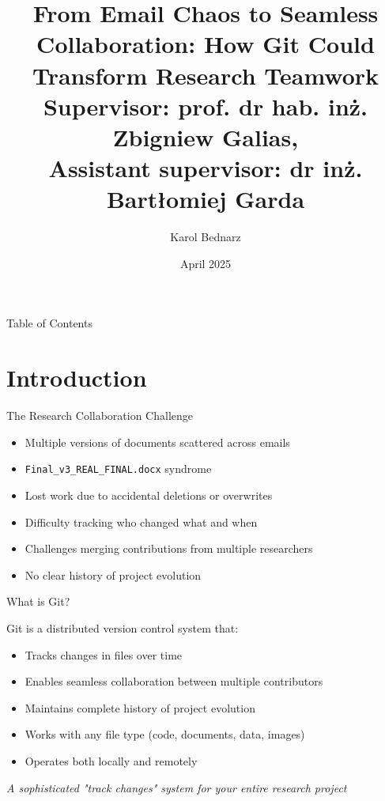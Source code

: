 \documentclass[aspectratio=1609]{beamer}
\title{ From Email Chaos to Seamless Collaboration: How Git Could Transform Research Teamwork\\
\small Supervisor: prof. dr hab. inż. Zbigniew Galias, \\
Assistant supervisor: dr inż. Bartłomiej Garda
}
\date{April 2025}
\author{Karol Bednarz}
\begin{document}
\begin{frame}
\titlepage
\end{frame}

\begin{frame}{Table of Contents}
    \tableofcontents
\end{frame}

\section{Introduction}
\begin{frame}[fragile]{The Research Collaboration Challenge}
    \begin{tblock}{}
        \begin{itemize}
            \item Multiple versions of documents scattered across emails
            \item \verb|Final_v3_REAL_FINAL.docx| syndrome
            \item Lost work due to accidental deletions or overwrites
            \item Difficulty tracking who changed what and when
            \item Challenges merging contributions from multiple researchers
            \item No clear history of project evolution
        \end{itemize}
    \end{tblock}
\end{frame}

\begin{frame}{What is Git?}
    \begin{tblock}{Git is a distributed version control system that:}
        \begin{itemize}
            \item Tracks changes in files over time
            \item Enables seamless collaboration between multiple contributors
            \item Maintains complete history of project evolution
            \item Works with any file type (code, documents, data, images)
            \item Operates both locally and remotely
        \end{itemize}
    \end{tblock}
    \begin{talert}{}
        \emph{A sophisticated "track changes" system for your entire research project}
    \end{talert}
\end{frame}
\end{document}
